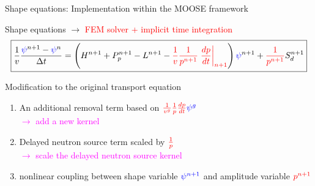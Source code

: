 \documentclass[8pt]{beamer}
\newcommand{\ben}{\begin{enumerate}}
\newcommand{\een}{\end{enumerate}}
\newcommand{\tcr}[1]{\textcolor{red}{#1}}
\newcommand{\tcb}[1]{\textcolor{blue}{#1}}
\newcommand{\tcm}[1]{\textcolor{magenta}{#1}}
\begin{document}
\begin{frame}{Shape equations: Implementation within the MOOSE framework}

\begin{block}{Shape equations $\to$ \tcr{FEM solver + implicit time integration}}
\begin{equation*}
\boxed{
\frac{1}{v}\frac{\tcb{\psi}^{n+1}-\tcb{\psi}^n }{\Delta t} = \left(H^{n+1} + P_p^{n+1} - L^{n+1} -\tcr{\frac{1}{v}\frac{1}{p^{n+1}}\left.\frac{dp}{dt}\right|_{n+1}} \right) \tcb{\psi}^{n+1}  + \tcr{\frac{1}{p^{n+1}}} S_{d}^{n+1} 
}
\end{equation*}
\end{block}

\begin{block}{Modification to the original transport equation}
\ben
\item An additional removal term based on $\tcr{\frac{1}{v^g}\frac{1}{p}\frac{dp}{dt}} \tcb{\psi^g}$\\
\tcm{$\to$ add a new kernel}
\item Delayed neutron source term scaled by $\tcr{\frac{1}{p}}$\\
\tcm{$\to$ scale the delayed neutron source kernel}
\item nonlinear coupling between shape variable $\tcb{\psi^{n+1}}$ and amplitude variable $\tcr{p^{n+1}}$
\een
\end{block}

\end{frame}

\end{document}
